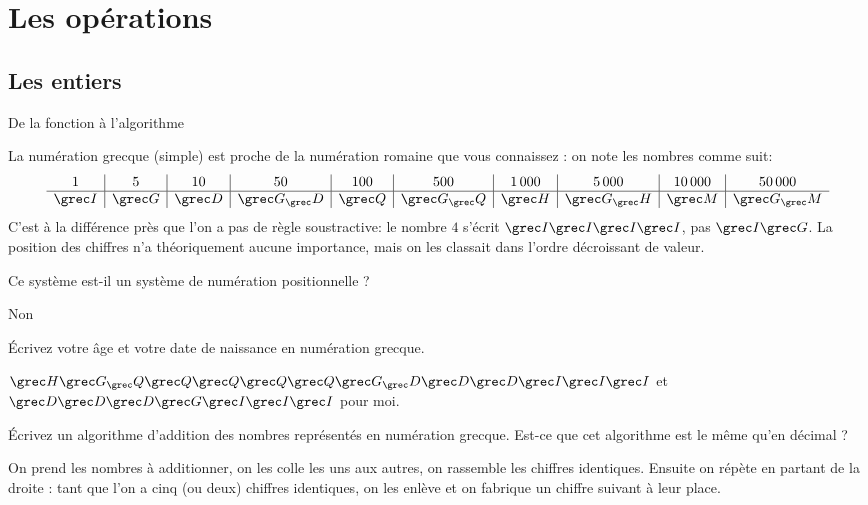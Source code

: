 \section{Les opérations}
\subsection{Les entiers}
\begin{exercice}
  \begin{exercicelet}{De la fonction à l'algorithme}

    La numération grecque (simple) est proche de la numération romaine que
    vous connaissez : on note les nombres comme suit:
    \[\begin{array}{c|c|c|c|c|c|c|c|c|c}
      1&5&10&50&100&500&1\,000&5\,000&10\,000&50\,000\\\hline
      \Iota&\Gamma&\Delta&\Gamma_\Delta&\Chi&\Gamma_\Chi&\Eta&\Gamma_\Eta&\Mu&\Gamma_\Mu
    \end{array}
    \] C'est à la différence près que l'on a pas de règle soustractive: le
    nombre $4$ s'écrit $\Iota\Iota\Iota\Iota$, pas $\Iota\Gamma$. La
    position des chiffres n'a théoriquement aucune importance, mais on les
    classait dans l'ordre décroissant de valeur.
    \begin{questions}
    \item Ce système est-il un système de numération positionnelle ?
      \begin{correction}Non\end{correction}
    \item Écrivez votre âge et votre date de naissance en numération
      grecque.
      \begin{xcorrection}$\Eta\Gamma_\Chi\Chi\Chi\Chi\Chi\Gamma_\Delta\Delta\Delta\Iota\Iota\Iota$
        et $\Delta\Delta\Delta\Gamma\Iota\Iota\Iota$ pour moi.\end{xcorrection}
    \item Écrivez un algorithme d'addition des nombres représentés en
      numération grecque. Est-ce que cet algorithme est le même qu'en décimal
      ?
      \begin{xcorrection}On prend les nombres à additionner, on les colle
        les uns aux autres, on rassemble les chiffres identiques. Ensuite on
        répète en partant de la droite : tant que l'on a cinq (ou deux) chiffres
        identiques, on les enlève et on fabrique un chiffre suivant à leur
        place.


\end{xcorrection}
\end{questions}
\end{exercicelet}
\end{exercice}
